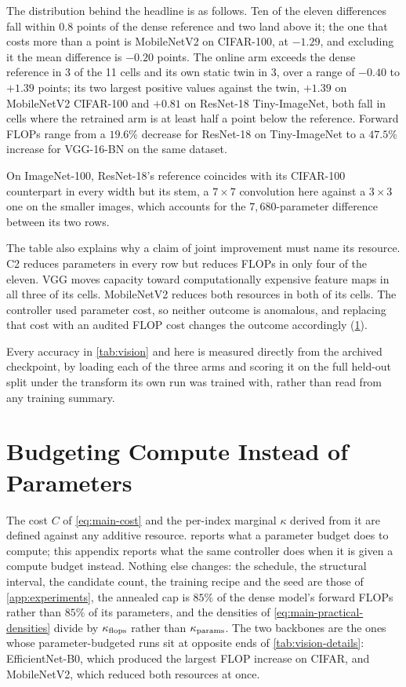 \documentclass[10pt]{article}
\theoremstyle{paper}
\begin{document}
The distribution behind the headline is as follows. Ten of the eleven differences fall within $0.8$ points of the dense reference and two land above it; the one that costs more than a point is MobileNetV2 on CIFAR-100, at $-1.29$, and excluding it the mean difference is $-0.20$ points. The online arm exceeds the dense reference in 3 of the 11 cells and its own static twin in 3, over a range of $-0.40$ to $+1.39$ points; its two largest positive values against the twin, $+1.39$ on MobileNetV2 CIFAR-100 and $+0.81$ on ResNet-18 Tiny-ImageNet, both fall in cells where the retrained arm is at least half a point below the reference. Forward FLOPs range from a $19.6\%$ decrease for ResNet-18 on Tiny-ImageNet to a $47.5\%$ increase for VGG-16-BN on the same dataset.

On ImageNet-100, ResNet-18's reference coincides with its CIFAR-100 counterpart in every width but its stem, a $7\times7$ convolution here against a $3\times3$ one on the smaller images, which accounts for the $7{,}680$-parameter difference between its two rows.

The table also explains why a claim of joint improvement must name its resource. C2 reduces parameters in every row but reduces FLOPs in only four of the eleven. VGG moves capacity toward computationally expensive feature maps in all three of its cells. MobileNetV2 reduces both resources in both of its cells. The controller used parameter cost, so neither outcome is anomalous, and replacing that cost with an audited FLOP cost changes the outcome accordingly (\cref{app:flops}).

Every accuracy in \cref{tab:vision} and here is measured directly from the archived checkpoint, by loading each of the three arms and scoring it on the full held-out split under the transform its own run was trained with, rather than read from any training summary.

\section{Budgeting Compute Instead of Parameters}
\label{app:flops}
The cost $C$ of \cref{eq:main-cost} and the per-index marginal $\kappa$ derived from it are defined against any additive resource.  reports what a parameter budget does to compute; this appendix reports what the same controller does when it is given a compute budget instead. Nothing else changes: the schedule, the structural interval, the candidate count, the training recipe and the seed are those of \cref{app:experiments}, the annealed cap is $85\%$ of the dense model's forward FLOPs rather than $85\%$ of its parameters, and the densities of \cref{eq:main-practical-densities} divide by $\kappa_{\rm flops}$ rather than $\kappa_{\rm params}$. The two backbones are the ones whose parameter-budgeted runs sit at opposite ends of \cref{tab:vision-details}: EfficientNet-B0, which produced the largest FLOP increase on CIFAR, and MobileNetV2, which reduced both resources at once.
\end{document}
